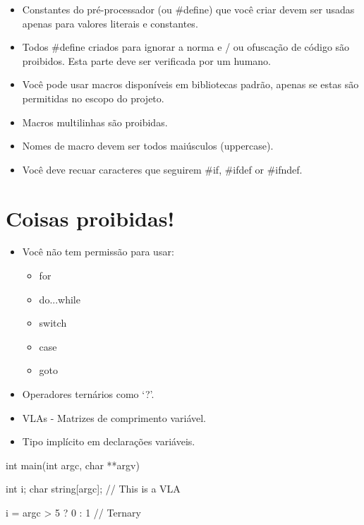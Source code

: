 \documentclass{42-pt}
\begin{document}
        \begin{itemize}

            \item Constantes do pré-processador (ou \#define) que você criar devem ser usadas
                apenas para valores literais e constantes.
            \item Todos \#define criados para ignorar a norma e / ou ofuscação de
                código são proibidos. Esta parte deve ser verificada por um humano.
            \item Você pode usar macros disponíveis em bibliotecas padrão, apenas
                se estas são permitidas no escopo do projeto.
            \item Macros multilinhas são proibidas.
            \item Nomes de macro devem ser todos maiúsculos (uppercase).
            \item Você deve recuar caracteres que seguirem \#if, \#ifdef
                or \#ifndef.

        \end{itemize}
        \newpage


    \section{Coisas proibidas!}

        \begin{itemize}

            \item Você não tem permissão para usar:

                \begin{itemize}

                    \item for
                    \item do...while
                    \item switch
                    \item case
                    \item goto

                \end{itemize}

            \item Operadores ternários como `?'.

            \item VLAs - Matrizes de comprimento variável.

            \item Tipo implícito em declarações variáveis.

        \end{itemize}
        \begin{42ccode}
    int main(int argc, char **argv)
    {
        int     i;
        char    string[argc]; // This is a VLA

        i = argc > 5 ? 0 : 1 // Ternary
    }
        \end{42ccode}
        \newpage
\end{document}
